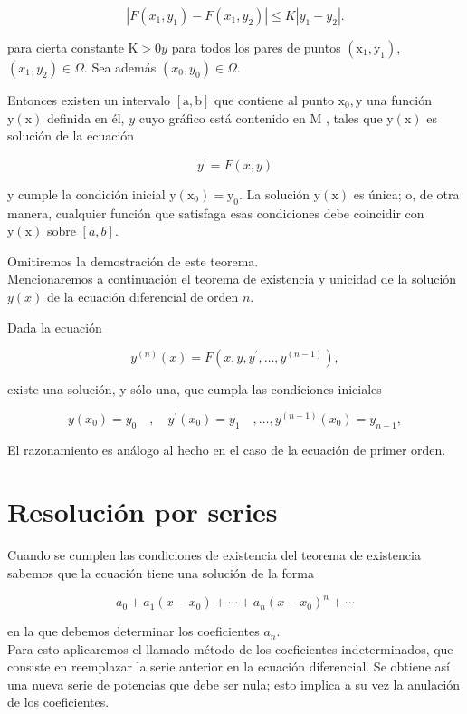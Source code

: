 \documentclass[10pt]{article}
\theoremstyle{plain}
\theoremstyle{definition}
\theoremstyle{remark}
\begin{document}
$$
\left|F\left(x_{1}, y_{1}\right)-F\left(x_{1}, y_{2}\right)\right| \leqslant K\left|y_{1}-y_{2}\right| .
$$

para cierta constante $\mathrm{K}>0 y$ para todos los pares de puntos $\left(\mathrm{x}_{1}, \mathrm{y}_{1}\right)$, $\left(x_{1}, y_{2}\right) \in \Omega$. Sea además $\left(x_{0}, y_{0}\right) \in \Omega$.

Entonces existen un intervalo $[\mathrm{a}, \mathrm{b}]$ que contiene al punto $\mathrm{x}_0, \mathrm{y}$ una función $\mathrm{y}(\mathrm{x})$ definida en él, $y$ cuyo gráfico está contenido en M , tales que $\mathrm{y}(\mathrm{x})$ es solución de la ecuación

$$
y^{\prime}=F(x, y)
$$

y cumple la condición inicial $\mathrm{y}\left(\mathrm{x}_0\right)=\mathrm{y}_0$. La solución $\mathrm{y}(\mathrm{x})$ es única; o, de otra manera, cualquier función que satisfaga esas condiciones debe coincidir con $\mathrm{y}(\mathrm{x})$ sobre $[a, b]$.

Omitiremos la demostración de este teorema.\\
Mencionaremos a continuación el teorema de existencia y unicidad de la solución $y(x)$ de la ecuación diferencial de orden $n$.

Dada la ecuación

$$
y^{(n)}(x)=F\left(x, y, y^{\prime}, \ldots, y^{(n-1)}\right),
$$

existe una solución, y sólo una, que cumpla las condiciones iniciales

$$
y\left(x_{0}\right)=y_{0} \quad, \quad y^{\prime}\left(x_{0}\right)=y_{1} \quad, \ldots, y^{(n-1)}\left(x_{0}\right)=y_{n-1},
$$

El razonamiento es análogo al hecho en el caso de la ecuación de primer orden.

\section{Resolución por series}
Cuando se cumplen las condiciones de existencia del teorema de existencia sabemos que la ecuación tiene una solución de la forma

$$
a_{0}+a_{1}\left(x-x_{0}\right)+\cdots+a_{n}\left(x-x_{0}\right)^{n}+\cdots
$$

en la que debemos determinar los coeficientes $a_{n}$.\\
Para esto aplicaremos el llamado método de los coeficientes indeterminados, que consiste en reemplazar la serie anterior en la ecuación diferencial. Se obtiene así una nueva serie de potencias que debe ser nula; esto implica a su vez la anulación de los coeficientes.
\end{document}
